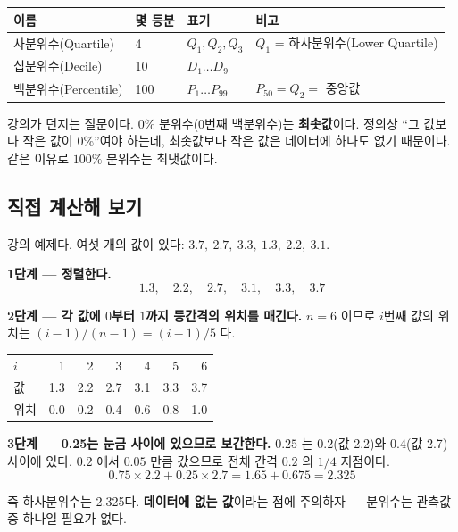 \begin{center}
\begin{tabularx}{\linewidth}{@{}l l l X@{}}
\toprule
이름 & 몇 등분 & 표기 & 비고 \\
\midrule
사분위수(Quartile) & 4 & $Q_1, Q_2, Q_3$ & $Q_1$ = 하사분위수(Lower Quartile) \\
십분위수(Decile) & 10 & $D_1 \dots D_9$ & \\
백분위수(Percentile) & 100 & $P_1 \dots P_{99}$ & $P_{50} = Q_2 = $ 중앙값 \\
\bottomrule
\end{tabularx}
\end{center}

\begin{pitfall}
강의가 던지는 질문이다. $0\%$ 분위수(0번째 백분위수)는 \textbf{최솟값}이다.
정의상 ``그 값보다 작은 값이 $0\%$''여야 하는데, 최솟값보다 작은 값은 데이터에
하나도 없기 때문이다. 같은 이유로 $100\%$ 분위수는 최댓값이다.
\end{pitfall}

\subsection{직접 계산해 보기}
\label{subsec:quantile-calc}

\begin{example}
\label{ex:quantile}
강의 예제다. 여섯 개의 값이 있다: $3.7,\ 2.7,\ 3.3,\ 1.3,\ 2.2,\ 3.1$.

\textbf{1단계 --- 정렬한다.}
\[
  1.3,\quad 2.2,\quad 2.7,\quad 3.1,\quad 3.3,\quad 3.7
\]

\textbf{2단계 --- 각 값에 $0$부터 $1$까지 등간격의 위치를 매긴다.}
$n = 6$ 이므로 $i$번째 값의 위치는 $(i-1)/(n-1) = (i-1)/5$ 다.

\begin{center}
\begin{tabular}{@{}lrrrrrr@{}}
\toprule
$i$ & 1 & 2 & 3 & 4 & 5 & 6 \\
값 & 1.3 & 2.2 & 2.7 & 3.1 & 3.3 & 3.7 \\
위치 & 0.0 & 0.2 & 0.4 & 0.6 & 0.8 & 1.0 \\
\bottomrule
\end{tabular}
\end{center}

\textbf{3단계 --- 0.25는 눈금 사이에 있으므로 보간한다.}
$0.25$ 는 $0.2$(값 2.2)와 $0.4$(값 2.7) 사이에 있다. $0.2$ 에서
$0.05$ 만큼 갔으므로 전체 간격 $0.2$ 의 $1/4$ 지점이다.
\[
  0.75 \times 2.2 + 0.25 \times 2.7 = 1.65 + 0.675 = \mathbf{2.325}
\]

즉 하사분위수는 2.325다. \textbf{데이터에 없는 값}이라는 점에 주의하자 ---
분위수는 관측값 중 하나일 필요가 없다.
\end{example}


